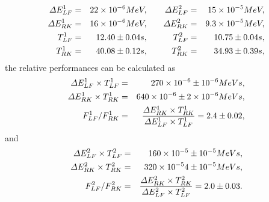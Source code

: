 \documentclass[a4paper,oneside,12pt]{report}
\numberwithin{equation}{chapter}
\begin{document}
\vspace{-10pt}\begin{eqnarray*}
    \begin{aligned}
        \Delta E_{LF}^1 &=& 22 \times 10^{-6} MeV, \\
        \Delta E_{RK}^1 &=& 16 \times 10^{-6} MeV, \\
        T_{LF}^1 &=& 12.40 \pm 0.04 s, \\
        T_{RK}^1 &=& 40.08 \pm 0.12 s, 
    \end{aligned}
    \qquad
    \begin{aligned}
        \Delta E_{LF}^2 &=& 15 \times 10^{-5} MeV, \\
        \Delta E_{RK}^2 &=& 9.3 \times 10^{-5} MeV, \\
        T_{LF}^2 &=& 10.75 \pm 0.04 s, \\
        T_{RK}^2 &=& 34.93 \pm 0.39 s, 
    \end{aligned}
\vspace{-20pt}\end{eqnarray*}
the relative performances can be calculated as
\vspace{-10pt}\begin{eqnarray} 
    \Delta E_{LF}^1 \times T_{LF}^1 &=& 270 \times 10^{-6} \pm 10^{-6} MeV s, \\ %
    \Delta E_{RK}^1 \times T_{RK}^1 &=& 640 \times 10^{-6} \pm 2\times 10^{-6}  MeV s, \\ %
    F_{LF}^1/F_{RK}^1 &=& \frac{\Delta E_{RK}^1 \times T_{RK}^1 }{\Delta E_{LF}^1 \times T_{LF}^1} = 2.4 \pm 0.02, \label{eq:f_lf_rk_1}
\vspace{-20pt}\end{eqnarray}
and
\vspace{-10pt}\begin{eqnarray}  
    \Delta E_{LF}^2 \times T_{LF}^2 &=& 160 \times 10^{-5} \pm 10^{-5} MeV s, \\ %
    \Delta E_{RK}^2 \times T_{RK}^2 &=& 320 \times 10^{-5} 4 \pm 10^{-5} MeV s, \\ %
    F_{LF}^2/F_{RK}^2 &=& \frac{\Delta E_{RK}^2 \times T_{RK}^2 }{\Delta E_{LF}^2 \times T_{LF}^2} = 2.0  \pm 0.03. \label{eq:f_lf_rk_2}
\vspace{-10pt}\end{eqnarray}
\end{document}
